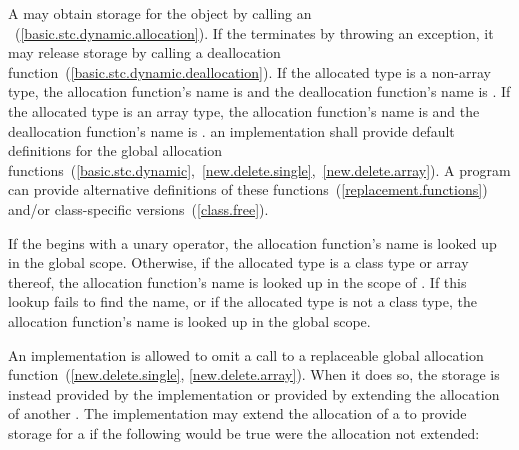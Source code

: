 \pnum
A  may obtain storage for the object by calling an
~(\ref{basic.stc.dynamic.allocation}). If
the  terminates by throwing an exception, it
may release storage by calling a deallocation
function~(\ref{basic.stc.dynamic.deallocation}). If the allocated type
is a non-array type, the allocation function's name is
%
%
 and the deallocation function's name is
. If the allocated type is an array type, the
allocation function's name is
%
%
and the deallocation function's name is
.
\enternote 
an implementation shall provide default definitions for the global
allocation
functions~(\ref{basic.stc.dynamic},~\ref{new.delete.single},~\ref{new.delete.array}).
A \Cpp program can provide alternative definitions of
these functions~(\ref{replacement.functions}) and/or class-specific
versions~(\ref{class.free}).
\exitnote 

\pnum
{}%
If the  begins with a unary \tcode{::}
operator, the allocation function's name is looked up in the global
scope. Otherwise, if the allocated type is a class type  or
array thereof, the allocation function's name is looked up in the scope
of . If this lookup fails to find the name, or if the allocated
type is not a class type, the allocation function's name is looked up in
the global scope.

\pnum
An implementation is allowed to omit a call to a replaceable global allocation
function~(\ref{new.delete.single}, \ref{new.delete.array}). When it does so,
the storage is instead provided by the implementation or provided by extending
the allocation of another . The implementation may
extend the allocation of a   to provide
storage for a   if the
following would be true were the allocation not extended:

